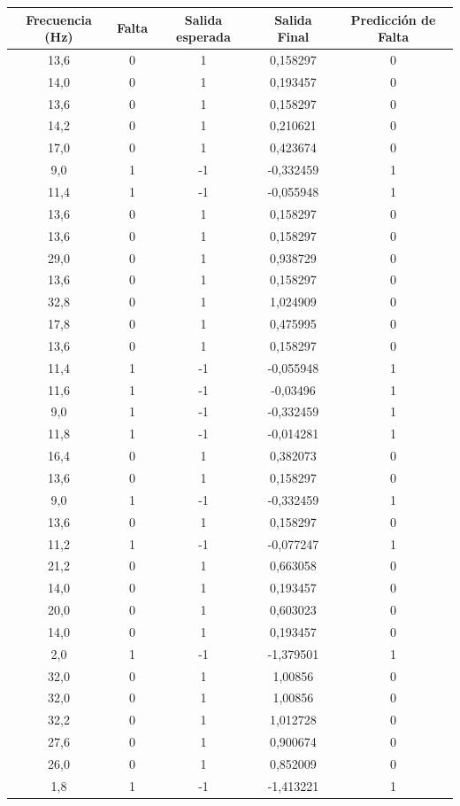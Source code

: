 \documentclass[a0paper,portrait]{baposter}
\begin{document}
\begin{poster}
{%




\begin{center}
\begin{tabular}{ccccc}
\toprule
Frecuencia (Hz) & Falta &Salida esperada &Salida Final & Predicción de Falta \\
\midrule
13,6 & 0 & 1 & 0,158297 & 0 \\
14,0 & 0 & 1 & 0,193457 & 0 \\
13,6 & 0 & 1 & 0,158297 & 0 \\
14,2 & 0 & 1 & 0,210621 & 0 \\
17,0 & 0 & 1 & 0,423674 & 0 \\
9,0 & 1 & -1 & -0,332459 & 1 \\
11,4 & 1 & -1 & -0,055948 & 1 \\
13,6 & 0 & 1 & 0,158297 & 0 \\
13,6 & 0 & 1 & 0,158297 & 0 \\
29,0 & 0 & 1 & 0,938729 & 0 \\
13,6 & 0 & 1 & 0,158297 & 0 \\
32,8 & 0 & 1 & 1,024909 & 0 \\
17,8 & 0 & 1 & 0,475995 & 0 \\
13,6 & 0 & 1 & 0,158297 & 0 \\
11,4 & 1 & -1 & -0,055948 & 1 \\
11,6 & 1 & -1 & -0,03496 & 1 \\
9,0 & 1 & -1 & -0,332459 & 1 \\
11,8 & 1 & -1 & -0,014281 & 1 \\
16,4 & 0 & 1 & 0,382073 & 0 \\
13,6 & 0 & 1 & 0,158297 & 0 \\
9,0 & 1 & -1 & -0,332459 & 1 \\
13,6 & 0 & 1 & 0,158297 & 0 \\
11,2 & 1 & -1 & -0,077247 & 1 \\
21,2 & 0 & 1 & 0,663058 & 0 \\
14,0 & 0 & 1 & 0,193457 & 0 \\
20,0 & 0 & 1 & 0,603023 & 0 \\
14,0 & 0 & 1 & 0,193457 & 0 \\
2,0 & 1 & -1 & -1,379501 & 1 \\
32,0 & 0 & 1 & 1,00856 & 0 \\
32,0 & 0 & 1 & 1,00856 & 0 \\
32,2 & 0 & 1 & 1,012728 & 0 \\
27,6 & 0 & 1 & 0,900674 & 0 \\
26,0 & 0 & 1 & 0,852009 & 0 \\
1,8 & 1 & -1 & -1,413221 & 1 \\
\bottomrule
\end{tabular}
\end{center}

}
\end{poster}
\end{document}
